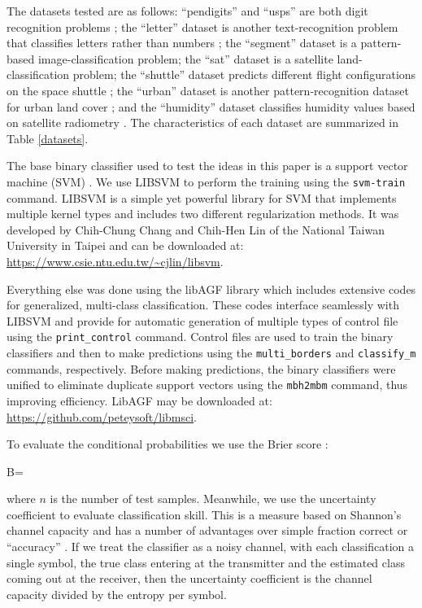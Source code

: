 The datasets tested are as follows: 
``pendigits'' and ``usps'' are both digit recognition problems 
\citep{Alimoglu1996,Hull1994};
the ``letter'' dataset is another text-recognition problem 
that classifies letters rather than numbers 
\citep{Frey_Slate1991};
the ``segment'' dataset is a pattern-based image-classification problem;
the ``sat'' dataset is a satellite land-classification problem;
the ``shuttle'' dataset predicts different flight configurations on the
space shuttle \citep{Michie_etal1994,King_etal1995};
the ``urban'' dataset is another pattern-recognition dataset for urban land cover
\citep{Johnson2013};
and the ``humidity'' dataset classifies humidity values based on satellite
radiometry \citep{Mills2009}.
The characteristics of each dataset are summarized in Table \ref{datasets}.

The base binary classifier used to test the ideas in this paper is a 
support vector machine (SVM) \citep{Mueller_etal2001}.
We use LIBSVM \citep{Chang_Lin2011} to perform the training
using the \verb/svm-train/ command.
LIBSVM is a simple yet powerful library for SVM that implements multiple
kernel types and includes two different regularization methods.
It was developed by Chih-Chung Chang and Chih-Hen Lin of the National
Taiwan University in Taipei
and can be downloaded at: \url{https://www.csie.ntu.edu.tw/~cjlin/libsvm}.

Everything else was done using the libAGF library \citep{Mills2011,Mills2018}
which includes extensive codes for generalized, multi-class classification.
These codes interface seamlessly with LIBSVM and provide for automatic
generation of multiple types of control file using the \verb/print_control/
command.
Control files are used to train the binary classifiers and then
to make predictions using the \verb/multi_borders/ and \verb/classify_m/
commands, respectively.
Before making predictions, the binary classifiers were unified to eliminate
duplicate support vectors using the \verb/mbh2mbm/ command, thus improving
efficiency.
LibAGF may be downloaded at: \url{https://github.com/peteysoft/libmsci}.

To evaluate the conditional probabilities we use the Brier score
\citep{Brier1950,Jolliffe_Stephenson2003}:
\begin{eqnnon}
B=
\end{eqnnon}
where $n$ is the number of test samples.
Meanwhile, we use the uncertainty coefficient to evaluate classification skill.
This is a measure based on Shannon's channel capacity \citep{Shannon} and
has a number of advantages over simple fraction correct or ``accuracy''
\citep{Press_etal1992,Mills2011}.
If we treat the classifier as a noisy channel, with each classification a
single symbol, the true class entering at the transmitter and the estimated
class coming out at the receiver,
then the uncertainty coefficient is the channel capacity divided by the
entropy per symbol.


